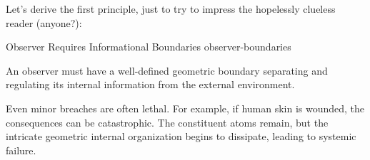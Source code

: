 Let’s derive the first principle, just to try to impress the hopelessly clueless reader (anyone?):


\begin{principle}{Observer Requires Informational Boundaries}
{observer-boundaries}

An observer must have a well-defined geometric boundary separating and regulating its internal information from the external environment. 

\end{principle}

Even minor breaches are often lethal. For example, if human skin is wounded, the consequences can be catastrophic.
The constituent atoms remain, but the intricate geometric internal organization begins to dissipate, leading to systemic failure.


